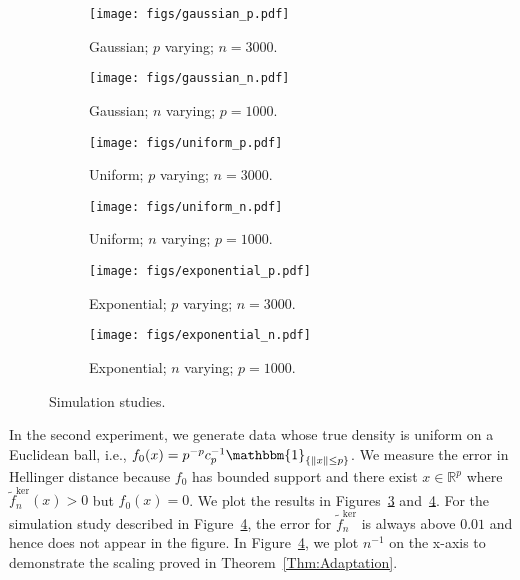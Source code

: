 \documentclass[a4paper,12pt]{article}
\begin{document}
\begin{figure}[ht!]
  \centering
  \begin{subfigure}[b]{0.45\linewidth}
    \centering
    \texttt{[image: figs/gaussian\_p.pdf]}\vspace{-0.1in}
    \caption{\label{Fig:Gaussian_p} Gaussian; $p$ varying; $n=3000$.}
  \end{subfigure}
  \begin{subfigure}[b]{0.45\linewidth}
    \centering
    \texttt{[image: figs/gaussian\_n.pdf]}\vspace{-0.1in}
    \caption{\label{Fig:Gaussian_n} Gaussian; $n$ varying; $p=1000$.}
  \end{subfigure}
  \begin{subfigure}[b]{0.45\linewidth}
    \centering
    \texttt{[image: figs/uniform\_p.pdf]}\vspace{-0.1in}
    \caption{\label{Fig:Uniform_p} Uniform; $p$ varying; $n=3000$.}
  \end{subfigure}
  \begin{subfigure}[b]{0.45\linewidth}
    \centering
    \texttt{[image: figs/uniform\_n.pdf]}\vspace{-0.1in}
    \caption{\label{Fig:Uniform_n} Uniform; $n$ varying; $p=1000$.}
  \end{subfigure}
  \begin{subfigure}[b]{0.45\linewidth}
    \centering
    \texttt{[image: figs/exponential\_p.pdf]}\vspace{-0.1in}
    \caption{\label{Fig:Exponential_n} Exponential; $p$ varying; $n=3000$.}
  \end{subfigure}
  \begin{subfigure}[b]{0.45\linewidth}
     \centering
     \texttt{[image: figs/exponential\_n.pdf]}\vspace{-0.1in}
     \caption{\label{Fig:Exponential_p} Exponential; $n$ varying; $p=1000$.}
  \end{subfigure}
  \caption{Simulation studies.}
\end{figure}
In the second experiment, we generate data whose true density is uniform on a Euclidean ball, i.e., $f_0(x) = p^{-p} c_p^{-1} \mathbbm{1}_{\{\|x \| \leq p\}}$. We measure the error in Hellinger distance because $f_0$ has bounded support and there exist $x \in \mathbb{R}^p$ where $\tilde{f}^{\mathrm{ker}}_n(x) > 0$ but $f_0(x) = 0$. We plot the results in Figures~\ref{Fig:Uniform_p} and~\ref{Fig:Uniform_n}. For the simulation study described in Figure~\ref{Fig:Uniform_n}, the error for $\tilde{f}^{\mathrm{ker}}_n$ is always above $0.01$ and hence does not appear in the figure.  In Figure~\ref{Fig:Uniform_n}, we plot $n^{-1}$ on the x-axis to demonstrate the scaling proved in Theorem~\ref{Thm:Adaptation}.
\end{document}
